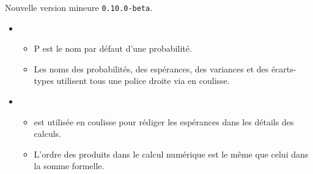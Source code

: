 Nouvelle version mineure \verb+0.10.0-beta+.

\begin{itemize}[itemsep=.5em]
    \item {}

    \begin{itemize}[itemsep=.5em]
        \item $\mathrm{P}$ est le nom par défaut d'une probabilité.

		\item Les noms des probabilités, des espérances, des variances et des écarts-types utilisent tous une police droite via  en coulisse.
    \end{itemize}




    \item {}

    \begin{itemize}[itemsep=.5em]
        \item {} est utilisée en coulisse pour rédiger les espérances dans les détails des calculs.
        
		\item L'ordre des produits dans le calcul numérique est le même que celui dans la somme formelle.
    \end{itemize}
\end{itemize}


\separation

